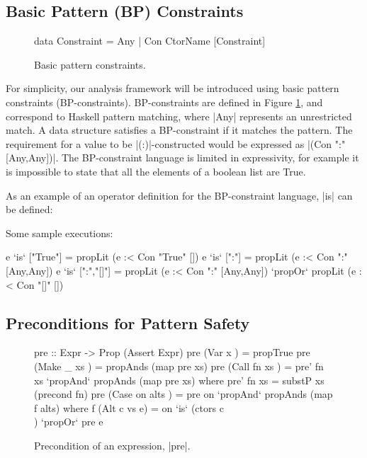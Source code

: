 \documentclass[preprint]{sigplanconf}
\begin{document}
\subsection{Basic Pattern (BP) Constraints}
\label{sec:basic}

\begin{figure}
\begin{code}
data Constraint = Any | Con CtorName [Constraint]
\end{code}
\caption{Basic pattern constraints.}
\label{fig:basic}
\end{figure}

For simplicity, our analysis framework will be introduced using basic pattern constraints (BP-constraints). BP-constraints are defined in Figure \ref{fig:basic}, and correspond to Haskell pattern matching, where |Any| represents an unrestricted match. A data structure satisfies a BP-constraint if it matches the pattern. The requirement for a value to be |(:)|-constructed would be expressed as |(Con ":" [Any,Any])|. The BP-constraint language is limited in expressivity, for example it is impossible to state that all the elements of a boolean list are True.

As an example of an operator definition for the BP-constraint language, |is| can be defined:


\noindent Some sample executions:

\begin{code}
e `is` ["True"]    =  propLit (e :< Con "True" [])
e `is` [":"]       =  propLit (e :< Con ":" [Any,Any])
e `is` [":","[]"]  =  propLit (e :< Con ":" [Any,Any]) `propOr`
                      propLit (e :< Con "[]" [])
\end{code}

\subsection{Preconditions for Pattern Safety}
\label{sec:precond}

\begin{figure}
\begin{code}
pre ::  Expr -> Prop (Assert Expr)
pre (Var   x         ) = propTrue
pre (Make  _   xs    ) = propAnds (map pre xs)
pre (Call  fn  xs    ) = pre' fn xs `propAnd` propAnds (map pre xs)
    where pre' fn xs = substP xs (precond fn)
pre (Case  on  alts  ) = pre on `propAnd` propAnds (map f alts)
    where f (Alt c vs e) = on `is` (ctors c \\ [c]) `propOr` pre e
\end{code}
\caption{Precondition of an expression, |pre|.}
\label{fig:precondition}
\end{figure}
\end{document}
